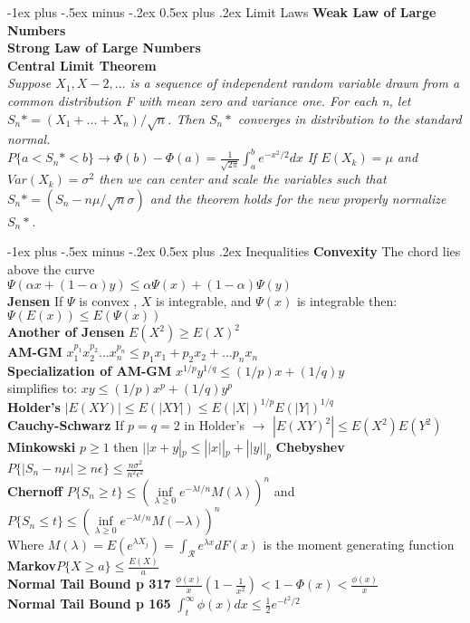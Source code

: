 \documentclass[10pt,landscape]{article}
\makeatletter
\renewcommand{\section}{\@startsection{section}{1}{0mm}%
                                {-1ex plus -.5ex minus -.2ex}%
                                {0.5ex plus .2ex}%
                                {\normalfont\large\bfseries}}
\makeatother
\begin{document}
\begin{multicols*}{3}
\section{Limit Laws}
\textbf{Weak Law of Large Numbers}\\
\textbf{Strong Law of Large Numbers}\\
\textbf{Central Limit Theorem}\\
\textit{Suppose $X_1,X-2,...$ is a sequence of independent random variable drawn from a common distribution F with mean zero and variance one. For each n, let $S_n*=(X_1+...+X_n)/\sqrt{n}$. Then $S_n*$ converges in distribution to the standard normal.}\\
	$P\{a<S_n*<b\}\rightarrow\Phi(b)-\Phi(a)=\frac{1}{\sqrt{2\pi}}\int_{a}^{b}e^{-x^2/2}dx$
\textit{If $E(X_k)=\mu$ and $Var(X_k)=\sigma^2$ then we can center and scale the variables such that $S_n*=(S_n - n\mu/\sqrt{n}\sigma)$ and the theorem holds for the new properly normalize $S_n*$.}

\section{Inequalities}
\textbf{Convexity} The chord lies above the curve\\
$\Psi(\alpha x +(1-\alpha)y)\leq \alpha\Psi(x)+(1-\alpha)\Psi(y)$\\
\textbf{Jensen} If $\Psi$ is convex , $X$ is integrable, and $\Psi(x)$ is integrable then:
$\Psi(E(x))\leq E(\Psi(x))$\\
\textbf{Another of Jensen} $E(X^2)\geq E(X)^2$\\
\textbf{AM-GM} $ x_1^{p_1} x_2^{p_2}...x_n^{p_n}\leq p_1 x_1 +p_2 x_2 + ... p_n x_n$\\
\textbf{Specialization of AM-GM} $x^{1/p} y^{1/q} \leq (1/p) x +(1/q) y$\\
simplifies to: $ xy \leq (1/p) x^p +(1/q) y^p$\\
\textbf{Holder's} $|E(XY)| \leq E(|XY|) \leq E(|X|)^{1/p} E(|Y|)^{1/q}$\\ 
\textbf{Cauchy-Schwarz} If $p=q=2$ in Holder's $\rightarrow$ $|E(XY)^2| \leq E(X^2)E(Y^2)$\\
\textbf{Minkowski} $p\geq 1$ then $ ||x+y|_p \leq ||x||_p + ||y||_p$
\textbf{Chebyshev}$P\{|S_n-n\mu|\geq n\epsilon\}\leq \frac{n\sigma^2}{n^2\epsilon^2}$\\
\textbf{Chernoff} $P\{S_n\geq t\} \leq (\inf\limits_{\lambda\geq 0} e^{-\lambda t/n}M(\lambda))^n $ and\\
$P\{S_n\leq t\} \leq (\inf\limits_{\lambda\geq 0} e^{-\lambda t/n}M(-\lambda))^n $\\ 
Where $M(\lambda)=E(e^{\lambda X_j})=\int_{\mathcal{R}} e^{\lambda x}dF(x)$ is the moment generating function\\
\textbf{Markov}$P\{X\geq a\} \leq \frac {E(X)}{a}$\\
\textbf{Normal Tail Bound p 317} $\frac{\phi(x)}{x}(1-\frac{1}{x^2}) < 1- \Phi(x) < \frac {\phi(x)}{x} $\\
\textbf{Normal Tail Bound p 165} $\int_{t}^{\infty}\phi(x) dx \leq \frac{1}{2}e^{-t^2/2}$

\end{multicols*}
\end{document}
